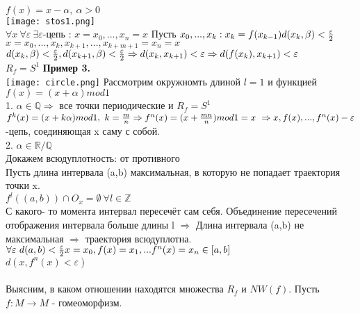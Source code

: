 \documentclass[12pt,a4paper]{article}
\begin{document}
\\ 
\(f(x)= x -\alpha,\ \alpha>0\)
\\ \texttt{[image: stos1.png]}
\\ \(\forall x \ \forall \varepsilon \ \exists \varepsilon\)-цепь : \(x=x_0,...,x_n =x\)
\newline Пусть  \(x_0,...,x_k: x_k=f(x_{k-1}) \\ d(x_k,\beta)< {\varepsilon \over {2}}\)
\\
\(x= x_0,...,x_k,x_{k+1},...,x_{k+m+1}=x_n=x\)
\\
\(d(x_k, \beta) <{\varepsilon \over {2}} , d(x_{k+1},\beta)< {\varepsilon \over {2}} \Rightarrow d(x_k,x_{k+1})< \varepsilon \\ \Rightarrow d(f(x_k), x_{k+1})<\varepsilon\)
\\
\(R_f =S^1\)
\newline \textbf{Пример 3.}
\\
\texttt{[image: circle.png]}
Рассмотрим окружномть длиной \(l=1\) и функцией \(f(x)= (x+\alpha) mod 1\) \\
1. \(\alpha \in \mathbb{Q} \Rightarrow\) все точки периодические и \(R_f = S^1\)
\\ \(f^k(x)= (x+k\alpha)mod 1, \ k={m \over {n}} \Rightarrow f^n(x) = (x + {mn\over {n}})mod 1 = x \ \Rightarrow x,f(x),..., f^n(x) - \varepsilon\)-цепь, соединяющая x саму с собой. \\
2. \(\alpha \in \mathbb{R} / \mathbb{Q}\)\\
Докажем всюдуплотность: от противного \\ Пусть длина интервала (a,b) максимальная, в которую не попадает траектория точки x. 
\\ \(f^l((a,b))\cap O_x =\emptyset \ \forall l \in \mathbb{Z}\) 
\\ С какого- то момента интервал пересечёт сам себя. Объединение пересечений отображения интервала больше длины l \(\Rightarrow\) Длина интервала (a,b) не максимальная \(\Rightarrow\) траектория всюдуплотна. 
\\ \(\forall \varepsilon \ d(a,b)<{\varepsilon \over {2}} \\ x=x_0,f(x)=x_1, ... f^n(x)=x_n \in [a,b]\)\\ \(d(x,f^n(x)<\varepsilon)\)
\\
\\
Выясним, в каком отношении находятся множества \(R_f\) и \(NW(f)\).
\newline Пусть \(f: M \to M\) - гомеоморфизм.\\
\end{document}
